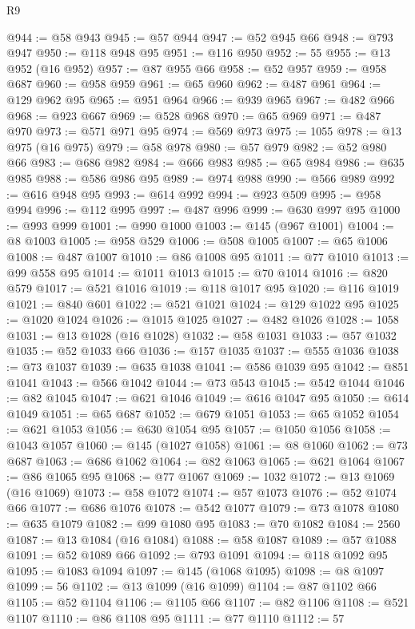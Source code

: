 \begin{lexlean}{R9}
\begin{coremodule}
@944 := @58 @943
@945 := @57 @944
@947 := @52 @945 @66
@948 := @793 @947
@950 := @118 @948 @95
@951 := @116 @950
@952 := 55
@955 := @13 @952 (@16 @952)
@957 := @87 @955 @66
@958 := @52 @957
@959 := @958 @687
@960 := @958 @959
@961 := @65 @960
@962 := @487 @961
@964 := @129 @962 @95
@965 := @951 @964
@966 := @939 @965
@967 := @482 @966
@968 := @923 @667
@969 := @528 @968
@970 := @65 @969
@971 := @487 @970
@973 := @571 @971 @95
@974 := @569 @973
@975 := 1055
@978 := @13 @975 (@16 @975)
@979 := @58 @978
@980 := @57 @979
@982 := @52 @980 @66
@983 := @686 @982
@984 := @666 @983
@985 := @65 @984
@986 := @635 @985
@988 := @586 @986 @95
@989 := @974 @988
@990 := @566 @989
@992 := @616 @948 @95
@993 := @614 @992
@994 := @923 @509
@995 := @958 @994
@996 := @112 @995
@997 := @487 @996
@999 := @630 @997 @95
@1000 := @993 @999
@1001 := @990 @1000
@1003 := @145 (@967 @1001)
@1004 := @8 @1003
@1005 := @958 @529
@1006 := @508 @1005
@1007 := @65 @1006
@1008 := @487 @1007
@1010 := @86 @1008 @95
@1011 := @77 @1010
@1013 := @99 @558 @95
@1014 := @1011 @1013
@1015 := @70 @1014
@1016 := @820 @579
@1017 := @521 @1016
@1019 := @118 @1017 @95
@1020 := @116 @1019
@1021 := @840 @601
@1022 := @521 @1021
@1024 := @129 @1022 @95
@1025 := @1020 @1024
@1026 := @1015 @1025
@1027 := @482 @1026
@1028 := 1058
@1031 := @13 @1028 (@16 @1028)
@1032 := @58 @1031
@1033 := @57 @1032
@1035 := @52 @1033 @66
@1036 := @157 @1035
@1037 := @555 @1036
@1038 := @73 @1037
@1039 := @635 @1038
@1041 := @586 @1039 @95
@1042 := @851 @1041
@1043 := @566 @1042
@1044 := @73 @543
@1045 := @542 @1044
@1046 := @82 @1045
@1047 := @621 @1046
@1049 := @616 @1047 @95
@1050 := @614 @1049
@1051 := @65 @687
@1052 := @679 @1051
@1053 := @65 @1052
@1054 := @621 @1053
@1056 := @630 @1054 @95
@1057 := @1050 @1056
@1058 := @1043 @1057
@1060 := @145 (@1027 @1058)
@1061 := @8 @1060
@1062 := @73 @687
@1063 := @686 @1062
@1064 := @82 @1063
@1065 := @621 @1064
@1067 := @86 @1065 @95
@1068 := @77 @1067
@1069 := 1032
@1072 := @13 @1069 (@16 @1069)
@1073 := @58 @1072
@1074 := @57 @1073
@1076 := @52 @1074 @66
@1077 := @686 @1076
@1078 := @542 @1077
@1079 := @73 @1078
@1080 := @635 @1079
@1082 := @99 @1080 @95
@1083 := @70 @1082
@1084 := 2560
@1087 := @13 @1084 (@16 @1084)
@1088 := @58 @1087
@1089 := @57 @1088
@1091 := @52 @1089 @66
@1092 := @793 @1091
@1094 := @118 @1092 @95
@1095 := @1083 @1094
@1097 := @145 (@1068 @1095)
@1098 := @8 @1097
@1099 := 56
@1102 := @13 @1099 (@16 @1099)
@1104 := @87 @1102 @66
@1105 := @52 @1104
@1106 := @1105 @66
@1107 := @82 @1106
@1108 := @521 @1107
@1110 := @86 @1108 @95
@1111 := @77 @1110
@1112 := 57

\end{coremodule}
\end{lexlean}
